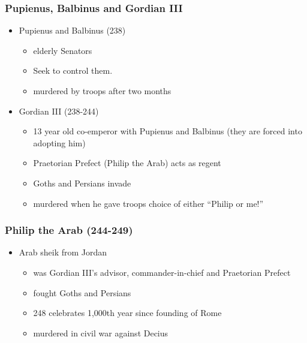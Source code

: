 \documentclass[12pt, twoside]{article}
\begin{document}
\subsubsection{Pupienus, Balbinus and Gordian III}
\begin{itemize}
\item Pupienus and Balbinus (238)
	\begin{itemize}
	\item elderly Senators
 	\item Seek to control them.
	\item murdered by troops after two months
	\end{itemize}
\item Gordian III (238-244)
	\begin{itemize}
	\item 13 year old co-emperor with Pupienus and Balbinus (they are forced into adopting him)
	\item Praetorian Prefect (Philip the Arab) acts as regent
	\item Goths and Persians invade
	\item murdered when he gave troops choice of either “Philip or me!”
	\end{itemize}
\end{itemize}

\subsubsection{Philip the Arab (244-249)}
\begin{itemize}
\item Arab sheik from Jordan
	\begin{itemize}
	\item was Gordian III’s advisor, commander-in-chief and Praetorian Prefect
	\item fought Goths and Persians
	\item 248 celebrates 1,000th year since founding of Rome
	\item murdered in civil war against Decius
	\end{itemize}
\end{itemize}
\end{document}
